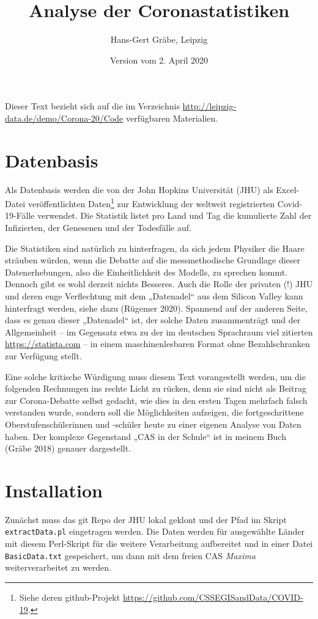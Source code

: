 \documentclass[a4paper,11pt]{article}
\title{Analyse der Coronastatistiken}
\author{Hans-Gert Gräbe, Leipzig}
\date{Version vom 2. April 2020}
\begin{document}
\maketitle

Dieser Text bezieht sich auf die im Verzeichnis
\url{http://leipzig-data.de/demo/Corona-20/Code} verfügbaren Materialien.

\section{Datenbasis}

Als Datenbasis werden die von der John Hopkins Universität (JHU) als
Excel-Datei veröffentlichten Daten\footnote{Siehe deren github-Projekt
  \url{https://github.com/CSSEGISandData/COVID-19}.} zur Entwicklung der
weltweit registrierten Covid-19-Fälle verwendet. Die Statistik listet pro Land
und Tag die kumulierte Zahl der Infizierten, der Genesenen und der Todesfälle
auf.

Die Statistiken sind natürlich zu hinterfragen, da sich jedem Physiker die
Haare sträuben würden, wenn die Debatte auf die messmethodische Grundlage
dieser Datenerhebungen, also die Einheitlichkeit des Modells, zu sprechen
kommt.  Dennoch gibt es wohl derzeit nichts Besseres. Auch die Rolle der
privaten (!)  JHU und deren enge Verflechtung mit dem „Datenadel“ aus dem
Silicon Valley kann hinterfragt werden, siehe dazu (Rügemer 2020).  Spannend
auf der anderen Seite, dass es genau dieser „Datenadel“ ist, der solche Daten
zusammenträgt und der Allgemeinheit -- im Gegensatz etwa zu der im deutschen
Sprachraum viel zitierten \url{https://statista.com} -- in einem
maschinenlesbaren Format ohne Bezahlschranken zur Verfügung stellt.

Eine solche kritische Würdigung muss diesem Text vorangestellt werden, um die
folgenden Rechnungen ins rechte Licht zu rücken, denn sie sind nicht als
Beitrag zur Corona-Debatte selbst gedacht, wie dies in den ersten Tagen
mehrfach falsch verstanden wurde, sondern soll die Möglichkeiten aufzeigen,
die fortgeschrittene Oberstufenschülerinnen und -schüler heute zu einer
eigenen Analyse von Daten haben.  Der komplexe Gegenstand „CAS in der Schule“
ist in meinem Buch (Gräbe 2018) genauer dargestellt. 

\section{Installation} 

Zunächst muss das git Repo der JHU lokal geklont und der Pfad im Skript
\texttt{extractData.pl} eingetragen werden.  Die Daten werden für ausgewählte
Länder mit diesem Perl-Skript für die weitere Verarbeitung aufbereitet und in
einer Datei \texttt{BasicData.txt} gespeichert, um dann mit dem freien CAS
\emph{Maxima} weiterverarbeitet zu werden.
\end{document}
